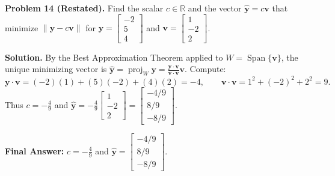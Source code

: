 \documentclass[11pt, letterpaper]{article}
\theoremstyle{definition}
\theoremstyle{remark}
\newcommand{\R}{\mathbb{R}}
\begin{document}
\medskip
\textbf{Problem 14 (Restated).} Find the scalar $c \in \R$ and the vector $\hat{\mathbf{y}} = c\mathbf{v}$ that minimize $\|\mathbf{y} - c\mathbf{v}\|$ for $\mathbf{y} = \begin{bmatrix} -2 \\ 5 \\ 4 \end{bmatrix}$ and $\mathbf{v} = \begin{bmatrix} 1 \\ -2 \\ 2 \end{bmatrix}$.

\textbf{Solution.}
By the Best Approximation Theorem applied to $W = \operatorname{Span}\{\mathbf{v}\}$, the unique minimizing vector is $\hat{\mathbf{y}} = \operatorname{proj}_W \mathbf{y} = \frac{\mathbf{y}\cdot\mathbf{v}}{\mathbf{v}\cdot\mathbf{v}}\mathbf{v}$. Compute:
\[
\mathbf{y} \cdot \mathbf{v} = (-2)(1) + (5)(-2) + (4)(2) = -4, \qquad \mathbf{v} \cdot \mathbf{v} = 1^2 + (-2)^2 + 2^2 = 9.
\]
Thus $c = -\frac{4}{9}$ and $\hat{\mathbf{y}} = -\frac{4}{9}\begin{bmatrix} 1 \\ -2 \\ 2 \end{bmatrix} = \begin{bmatrix} -4/9 \\ 8/9 \\ -8/9 \end{bmatrix}$.

\textbf{Final Answer:} $c = -\frac{4}{9}$ and $\hat{\mathbf{y}} = \begin{bmatrix} -4/9 \\ 8/9 \\ -8/9 \end{bmatrix}$.
\end{document}
